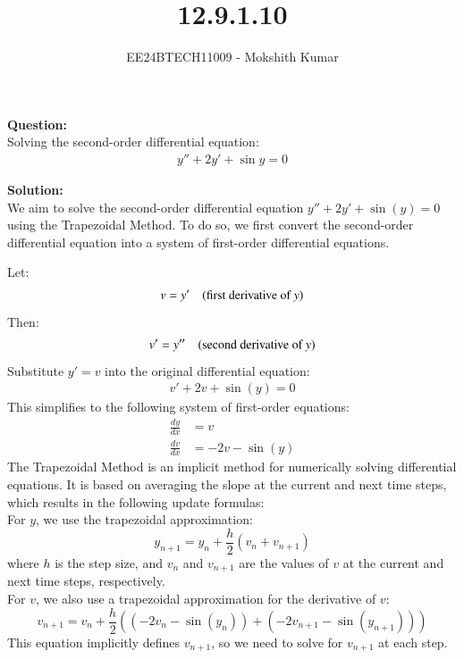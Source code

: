 \documentclass[journal]{IEEEtran}
\begin{document}

\vspace{3cm}

\title{12.9.1.10}
\author{EE24BTECH11009 - Mokshith Kumar}
\maketitle

\textbf{Question:}\\
Solving the second-order differential equation:
\begin{align}
y'' + 2y' + \sin{y} = 0
\end{align}

\textbf{Solution:}\\
We aim to solve the second-order differential equation \( y'' + 2y' + \sin(y) = 0 \) using the Trapezoidal Method. To do so, we first convert the second-order differential equation into a system of first-order differential equations.

Let:
\begin{align}
v = y' \quad \text{(first derivative of \( y \))}\\
\end{align}
Then:
\begin{align}
v' = y'' \quad \text{(second derivative of \( y \))}
\end{align}
Substitute \( y' = v \) into the original differential equation:
\begin{align}
v' + 2v + \sin(y) = 0
\end{align}
This simplifies to the following system of first-order equations:
\begin{align}
\frac{dy}{dx} &= v\\
\frac{dv}{dx} &= -2v - \sin(y)
\end{align}
The Trapezoidal Method is an implicit method for numerically solving differential equations. It is based on averaging the slope at the current and next time steps, which results in the following update formulas:\\
For \( y \), we use the trapezoidal approximation:
\begin{equation}
    y_{n+1} = y_n + \frac{h}{2} \left( v_n + v_{n+1} \right)
\end{equation}
where \( h \) is the step size, and \( v_n \) and \( v_{n+1} \) are the values of \( v \) at the current and next time steps, respectively.\\
For \( v \), we also use a trapezoidal approximation for the derivative of \( v \):
\begin{equation}
    v_{n+1} = v_n + \frac{h}{2} \left( (-2v_n - \sin(y_n)) + (-2v_{n+1} - \sin(y_{n+1})) \right)
\end{equation}
This equation implicitly defines \( v_{n+1} \), so we need to solve for \( v_{n+1} \) at each step.\\
\end{document}
